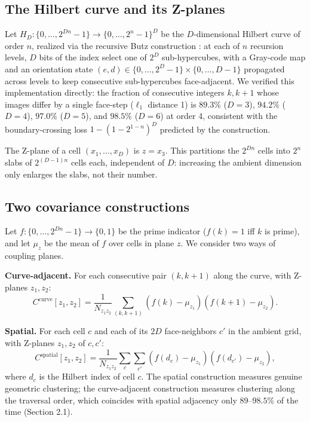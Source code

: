 \documentclass[11pt,a4paper]{article}
\begin{document}
\subsection{The Hilbert curve and its Z-planes}

Let $H_D: \{0,\ldots,2^{Dn}-1\} \to \{0,\ldots,2^n-1\}^D$ be the
$D$-dimensional Hilbert curve of order $n$, realized via the recursive
Butz construction \cite{butz1971,hamilton2006}: at each of $n$ recursion
levels, $D$ bits of the index select one of $2^D$ sub-hypercubes, with a
Gray-code map and an orientation state $(e,d) \in \{0,\ldots,2^D-1\} \times
\{0,\ldots,D-1\}$ propagated across levels to keep consecutive sub-hypercubes
face-adjacent. We verified this implementation directly: the fraction of
consecutive integers $k, k+1$ whose images differ by a single face-step
($\ell_1$ distance 1) is $89.3\%$ ($D=3$), $94.2\%$ ($D=4$), $97.0\%$
($D=5$), and $98.5\%$ ($D=6$) at order 4, consistent with the
boundary-crossing loss $1-(1-2^{1-n})^D$ predicted by the construction.

The Z-plane of a cell $(x_1,\ldots,x_D)$ is $z = x_3$. This partitions the
$2^{Dn}$ cells into $2^n$ slabs of $2^{(D-1)n}$ cells each, independent of
$D$: increasing the ambient dimension only enlarges the slabs, not their
number.

\subsection{Two covariance constructions}

Let $f: \{0,\ldots,2^{Dn}-1\} \to \{0,1\}$ be the prime indicator ($f(k)=1$
iff $k$ is prime), and let $\mu_z$ be the mean of $f$ over cells in plane
$z$. We consider two ways of coupling planes.

\textbf{Curve-adjacent.} For each consecutive pair $(k,k+1)$ along the
curve, with Z-planes $z_1,z_2$:
\begin{equation}
C^{\mathrm{curve}}[z_1,z_2] = \frac{1}{N_{z_1z_2}}\sum_{(k,k+1)} (f(k)-\mu_{z_1})(f(k+1)-\mu_{z_2}).
\end{equation}

\textbf{Spatial.} For each cell $c$ and each of its $2D$ face-neighbors
$c'$ in the ambient grid, with Z-planes $z_1,z_2$ of $c,c'$:
\begin{equation}
C^{\mathrm{spatial}}[z_1,z_2] = \frac{1}{N_{z_1z_2}}\sum_{c}\sum_{c'} (f(d_c)-\mu_{z_1})(f(d_{c'})-\mu_{z_2}),
\end{equation}
where $d_c$ is the Hilbert index of cell $c$. The spatial construction
measures genuine geometric clustering; the curve-adjacent construction
measures clustering along the traversal order, which coincides with spatial
adjacency only $89$--$98.5\%$ of the time (Section 2.1).
\end{document}

